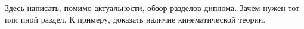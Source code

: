 
Здесь написать, помимо актуальности, обзор разделов диплома. Зачем нужен тот или иной раздел.
К примеру, доказать наличие кинематической теории.
